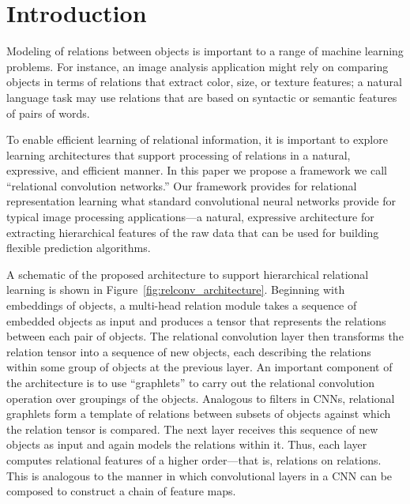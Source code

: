 \section{Introduction}\label{sec:intro}

Modeling of relations between objects is important to a range of machine learning problems. For instance, an image analysis application might rely on comparing objects in terms of relations that extract color, size, or texture features; a natural language task may use relations that are based on syntactic or semantic features of pairs of words. %

To enable efficient learning of relational information, it is important to explore learning architectures that support processing of relations in a natural, expressive, and efficient manner. In this paper we propose a framework we call ``relational convolution networks.'' Our framework provides for relational representation learning what standard convolutional neural networks provide for typical image processing applications---a natural, expressive architecture for extracting hierarchical features of the raw data that can be used for building flexible prediction algorithms.

A schematic of the proposed architecture to support hierarchical relational learning is shown in Figure~\ref{fig:relconv_architecture}. Beginning with embeddings of objects, a multi-head relation module takes a sequence of embedded objects as input and produces a tensor that represents the relations between each pair of objects. The relational convolution layer then transforms the relation tensor into a sequence of new objects, each describing the relations within some group of objects at the previous layer.  An important component of the architecture is to use ``graphlets'' to carry out the relational convolution operation over groupings of the objects. Analogous to filters in CNNs, relational graphlets form a template of relations between subsets of objects against which the relation tensor is compared. The next layer receives this sequence of new objects as input and again models the relations within it. Thus, each layer computes relational features of a higher order---that is, relations on relations. This is analogous to the manner in which convolutional layers in a CNN can be composed to construct a chain of feature maps.

